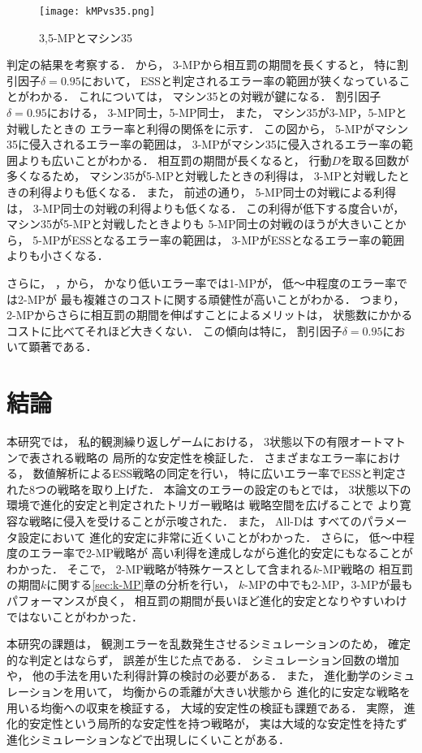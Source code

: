 \documentclass[submit]{ipsj}
\theoremstyle{definition}
\begin{document}
\begin{figure}[t]
  \centering
  \texttt{[image: kMPvs35.png]}
  \caption{3,5-MPとマシン35}
  \label{fig:kMP-vs-35}
\end{figure}

判定の結果を考察する．
から，
3-MPから相互罰の期間を長くすると，
特に割引因子$\delta = 0.95$において，
ESSと判定されるエラー率の範囲が狭くなっていることがわかる．
これについては，
マシン35との対戦が鍵になる．
割引因子$\delta = 0.95$における，
3-MP同士，5-MP同士，
また，
マシン35が3-MP，5-MPと対戦したときの
エラー率と利得の関係をに示す．
この図から，
5-MPがマシン35に侵入されるエラー率の範囲は，
3-MPがマシン35に侵入されるエラー率の範囲よりも広いことがわかる．
相互罰の期間が長くなると，
行動$D$を取る回数が多くなるため，
マシン35が5-MPと対戦したときの利得は，
3-MPと対戦したときの利得よりも低くなる．
また，
前述の通り，
5-MP同士の対戦による利得は，
3-MP同士の対戦の利得よりも低くなる．
この利得が低下する度合いが，
マシン35が5-MPと対戦したときよりも
5-MP同士の対戦のほうが大きいことから，
5-MPがESSとなるエラー率の範囲は，
3-MPがESSとなるエラー率の範囲よりも小さくなる．

さらに，
，から，
かなり低いエラー率では1-MPが，
低〜中程度のエラー率では2-MPが
最も複雑さのコストに関する頑健性が高いことがわかる．
つまり，
2-MPからさらに相互罰の期間を伸ばすことによるメリットは，
状態数にかかるコストに比べてそれほど大きくない．
この傾向は特に，
割引因子$\delta = 0.95$において顕著である．

\section{結論}

本研究では，
私的観測繰り返しゲームにおける，
3状態以下の有限オートマトンで表される戦略の
局所的な安定性を検証した．
さまざまなエラー率における，
数値解析によるESS戦略の同定を行い，
特に広いエラー率でESSと判定された8つの戦略を取り上げた．
本論文のエラーの設定のもとでは，
3状態以下の環境で進化的安定と判定されたトリガー戦略は
戦略空間を広げることで
より寛容な戦略に侵入を受けることが示唆された．
また，
All-Dは
すべてのパラメータ設定において
進化的安定に非常に近くいことがわかった．
さらに，
低〜中程度のエラー率で2-MP戦略が
高い利得を達成しながら進化的安定にもなることがわかった．
そこで，
2-MP戦略が特殊ケースとして含まれる$k$-MP戦略の
相互罰の期間$k$に関する\ref{sec:k-MP}章の分析を行い，
$k$-MPの中でも2-MP，3-MPが最もパフォーマンスが良く，
相互罰の期間が長いほど進化的安定となりやすいわけではないことがわかった．

本研究の課題は，
観測エラーを乱数発生させるシミュレーションのため，
確定的な判定とはならず，
誤差が生じた点である．
シミュレーション回数の増加や，
他の手法を用いた利得計算の検討の必要がある．
また，
進化動学のシミュレーションを用いて，
均衡からの乖離が大きい状態から
進化的に安定な戦略を用いる均衡への収束を検証する，
大域的安定性の検証も課題である．
実際，
進化的安定性という局所的な安定性を持つ戦略が，
実は大域的な安定性を持たず
進化シミュレーションなどで出現しにくいことがある\cite{koike-2022}．



\end{document}
